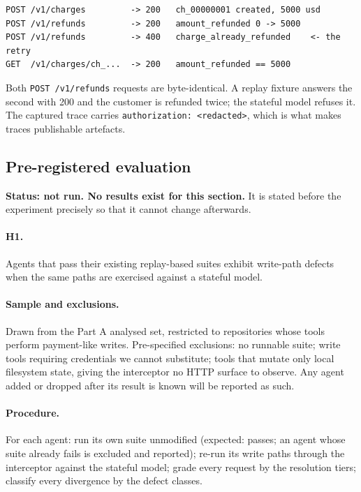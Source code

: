 \documentclass[11pt]{article}
\begin{document}
\begin{lstlisting}
POST /v1/charges         -> 200   ch_00000001 created, 5000 usd
POST /v1/refunds         -> 200   amount_refunded 0 -> 5000
POST /v1/refunds         -> 400   charge_already_refunded    <- the retry
GET  /v1/charges/ch_...  -> 200   amount_refunded == 5000
\end{lstlisting}

Both \texttt{POST /v1/refunds} requests are byte-identical. A replay fixture answers the
second with 200 and the customer is refunded twice; the stateful model refuses it. The
captured trace carries \texttt{authorization: <redacted>}, which is what makes traces
publishable artefacts.

\subsection{Pre-registered evaluation}
\label{sec:prereg}

\textbf{Status: not run. No results exist for this section.} It is stated before the
experiment precisely so that it cannot change afterwards.

\paragraph{H1.} Agents that pass their existing replay-based suites exhibit write-path
defects when the same paths are exercised against a stateful model.

\paragraph{Sample and exclusions.} Drawn from the Part A analysed set, restricted to
repositories whose tools perform payment-like writes. Pre-specified exclusions: no
runnable suite; write tools requiring credentials we cannot substitute; tools that mutate
only local filesystem state, giving the interceptor no HTTP surface to observe. Any agent
added or dropped after its result is known will be reported as such.

\paragraph{Procedure.} For each agent: run its own suite unmodified (expected: passes;
an agent whose suite already fails is excluded and reported); re-run its write paths
through the interceptor against the stateful model; grade every request by the resolution
tiers; classify every divergence by the defect classes.
\end{document}
